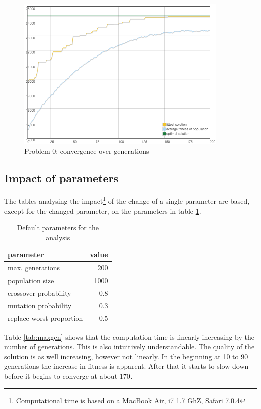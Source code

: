\documentclass[a4paper]{article}
\begin{document}
\begin{center}
\begin{figure}[h t b p]
\includegraphics[width=0.9\textwidth]{images/convergence-p0.png}
\caption{Problem 0: convergence over generations}
\label{fig:convergence-p0}
\end{figure}
\end{center}

\subsection{Impact of parameters}

The tables analysing the impact\footnote{Computational time is based on a MacBook Air, i7 1.7 GhZ, Safari 7.0.4} of the change of a single parameter are based, except for the changed parameter, on the parameters in table \ref{tab:default}.

\begin{table}[h t b p]
\begin{center}
\begin{tabular}{ l | r }
parameter & value \\
\hline
max. generations 		& 200	\\
population size 		& 1000	\\
crossover probability	& 0.8	\\
mutation probability	& 0.3	\\
replace-worst proportion& 0.5	
\end{tabular}
\caption{Default parameters for the analysis}
\label{tab:default}
\end{center}
\end{table}

Table \ref{tab:maxgen} shows that the computation time is linearly increasing by the number of generations. This is also intuitively understandable. The quality of the solution is as well increasing, however not linearly. In the beginning at 10 to 90 generations the increase in fitness is apparent. After that it starts to slow down before it begins to converge at about 170.
\end{document}
